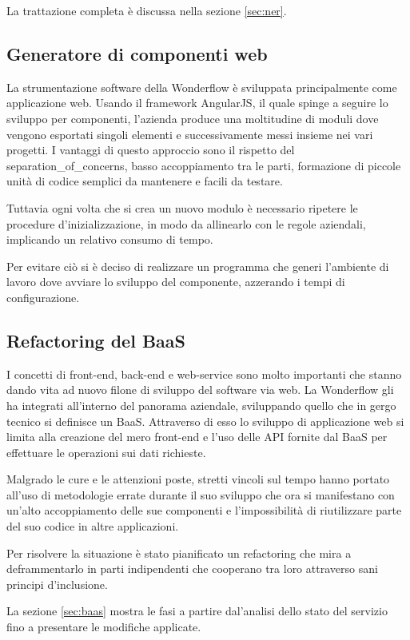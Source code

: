 La trattazione completa è discussa nella sezione \ref{sec:ner}.

\subsection{Generatore di componenti web}
La strumentazione software della Wonderflow è sviluppata principalmente come
applicazione web. Usando il framework AngularJS, il quale spinge a seguire lo
sviluppo per componenti, l'azienda produce una moltitudine di moduli dove
vengono esportati singoli elementi e successivamente messi insieme nei vari
progetti. I vantaggi di questo approccio sono il rispetto del
\gls{separation_of_concerns}, basso accoppiamento tra le parti,
formazione di piccole unità di codice semplici da mantenere e facili da testare.

Tuttavia ogni volta che si crea un nuovo modulo è necessario ripetere le
procedure d'inizializzazione, in modo da allinearlo con le regole aziendali,
implicando un relativo consumo di tempo.

Per evitare ciò si è deciso di realizzare un programma che generi l'ambiente di
lavoro dove avviare lo sviluppo del componente, azzerando i tempi di
configurazione.

\subsection{Refactoring del BaaS}
I concetti di \gls{front-end}, \gls{back-end} e \gls{web-service} sono molto
importanti che stanno dando vita ad nuovo filone di sviluppo del software via 
web. La Wonderflow gli ha integrati all'interno del panorama aziendale, 
sviluppando quello che in gergo tecnico si definisce un \gls{BaaS}. Attraverso
di esso lo sviluppo di applicazione web si limita alla creazione del mero
\gls{front-end} e l'uso delle \gls{API} fornite dal \gls{BaaS} per effettuare
le operazioni sui dati richieste.

Malgrado le cure e le attenzioni poste, stretti vincoli sul tempo hanno portato
all'uso di metodologie errate durante il suo sviluppo che ora si manifestano con
un'alto accoppiamento delle sue componenti e l'impossibilità di riutilizzare
parte del suo codice in altre applicazioni.

Per risolvere la situazione è stato pianificato un \gls{refactoring} che mira
a deframmentarlo in parti indipendenti che cooperano tra loro attraverso
sani principi d'inclusione.

La sezione \ref{sec:baas} mostra le fasi a partire dal'analisi dello stato del
servizio fino a presentare le modifiche applicate.

